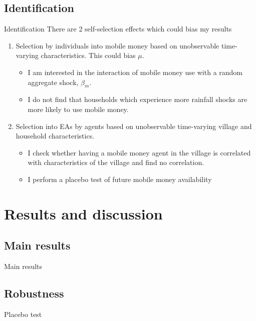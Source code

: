 \documentclass[t]{beamer}
\begin{document}
\subsection*{Identification}
\begin{frame}{Identification}
There are 2 self-selection effects which could bias my results
\begin{enumerate}
\item Selection by individuals into mobile money based on unobservable time-varying characteristics. This could bias $\mu$. \pause
\begin{itemize}
\item I am interested in the interaction of mobile money use with a random aggregate shock, $\beta_m$.	
\item I do not find that households which experience more rainfall shocks are more likely to use mobile money.\pause
\end{itemize}
\item Selection into EAs by agents based on unobservable time-varying village and household characteristics. \pause
\begin{itemize}
\item I check whether having a mobile money agent in the village is correlated with characteristics of the village and find no correlation. 
\item I perform a placebo test of future mobile money availability 
\end{itemize}
\end{enumerate}
 
\end{frame}
\section{Results and discussion}
\subsection*{Main results}
\begin{frame}[label=main results]{Main results}
\vspace{-10pt}

\end{frame}
\subsection*{Robustness}
\begin{frame}{Placebo test}
\vspace{-10pt}

\end{frame}
\end{document}
